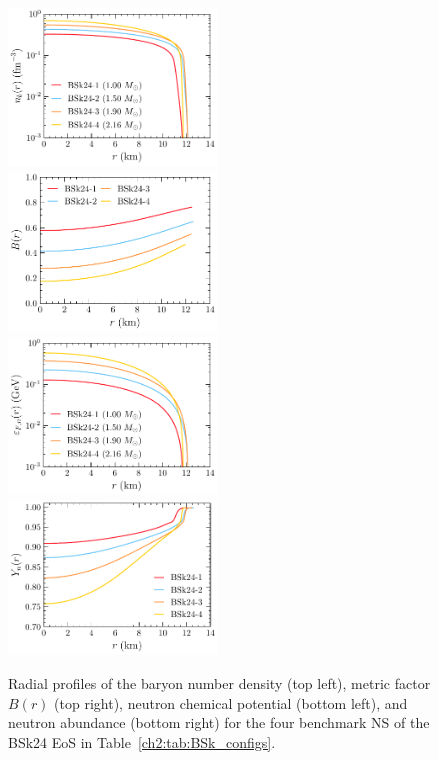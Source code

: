 \begin{figure}[t!bp]
    \centering
    \includegraphics[width=0.495\textwidth]{nb_BSk_prof.pdf}
    \includegraphics[width=0.495\textwidth]{B_BSk_prof.pdf}
    \includegraphics[width=0.495\textwidth]{epsFn_BSk_prof.pdf}
    \includegraphics[width=0.495\textwidth]{Yn_BSk_prof.pdf}
    \caption[Radial profiles of the baryon number density (top left), metric factor $B(r)$ (top right), neutron chemical potential (bottom left), and neutron abundance (bottom right) for the four benchmark NS of the BSk24 EoS in Table~\ref{ch2:tab:BSk_configs}.]{Radial profiles of the baryon number density (top left), metric factor $B(r)$ (top right), neutron chemical potential (bottom left), and neutron abundance (bottom right) for the four benchmark NS of the BSk24 EoS in Table~\ref{ch2:tab:BSk_configs}.}
    \label{ch2:fig:BSk_profiles}
\end{figure}
    

